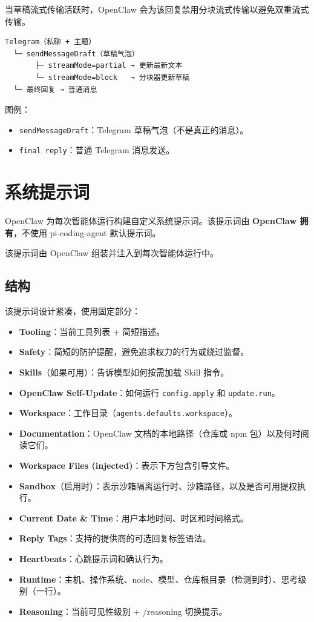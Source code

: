 当草稿流式传输活跃时，OpenClaw 会为该回复禁用分块流式传输以避免双重流式传输。

\begin{lstlisting}
Telegram（私聊 + 主题）
  └─ sendMessageDraft（草稿气泡）
       ├─ streamMode=partial → 更新最新文本
       └─ streamMode=block   → 分块器更新草稿
  └─ 最终回复 → 普通消息
\end{lstlisting}


图例：

\begin{itemize}
  \item \texttt{sendMessageDraft}：Telegram 草稿气泡（不是真正的消息）。
  \item \texttt{final reply}：普通 Telegram 消息发送。
\end{itemize}



\clearpage

\section{系统提示词}


OpenClaw 为每次智能体运行构建自定义系统提示词。该提示词由 \textbf{OpenClaw 拥有}，不使用 pi-coding-agent 默认提示词。

该提示词由 OpenClaw 组装并注入到每次智能体运行中。

\subsection{结构}


该提示词设计紧凑，使用固定部分：

\begin{itemize}
  \item \textbf{Tooling}：当前工具列表 + 简短描述。
  \item \textbf{Safety}：简短的防护提醒，避免追求权力的行为或绕过监督。
  \item \textbf{Skills}（如果可用）：告诉模型如何按需加载 Skill 指令。
  \item \textbf{OpenClaw Self-Update}：如何运行 \texttt{config.apply} 和 \texttt{update.run}。
  \item \textbf{Workspace}：工作目录（\texttt{agents.defaults.workspace}）。
  \item \textbf{Documentation}：OpenClaw 文档的本地路径（仓库或 npm 包）以及何时阅读它们。
  \item \textbf{Workspace Files (injected)}：表示下方包含引导文件。
  \item \textbf{Sandbox}（启用时）：表示沙箱隔离运行时、沙箱路径，以及是否可用提权执行。
  \item \textbf{Current Date \& Time}：用户本地时间、时区和时间格式。
  \item \textbf{Reply Tags}：支持的提供商的可选回复标签语法。
  \item \textbf{Heartbeats}：心跳提示词和确认行为。
  \item \textbf{Runtime}：主机、操作系统、node、模型、仓库根目录（检测到时）、思考级别（一行）。
  \item \textbf{Reasoning}：当前可见性级别 + /reasoning 切换提示。
\end{itemize}


